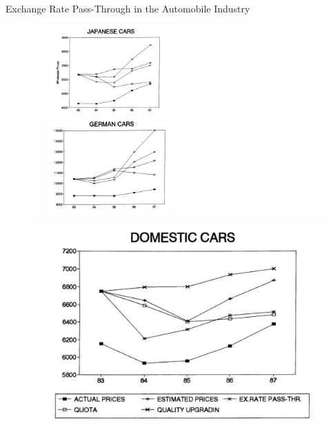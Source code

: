 \documentclass{beamer}
\begin{document}
\begin{frame}{Exchange Rate Pass-Through in the Automobile Industry}

   \begin{figure}
	   \begin{minipage}[t]{0.35\linewidth}
		   \centering
		   \includegraphics[height=3.5cm,width=6cm]{t11.png}
		   \end{minipage}%
		   \hfill
		   \begin{minipage}[t]{0.5\linewidth}
		   \centering
		   \includegraphics[height=3.5cm,width=6cm]{t12.png}
		   \end{minipage}

	   \end{figure}
	   \begin{figure}[h]
		   \centering          			
		   \includegraphics[scale=0.8]{t111.png}
		   \end{figure} 
\end{frame}  
\end{document}
